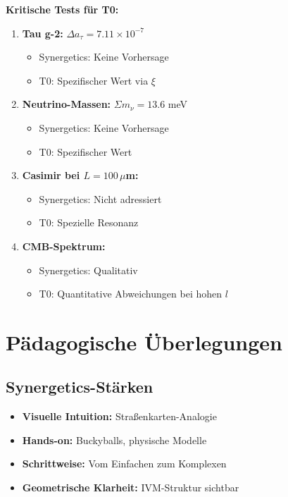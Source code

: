\documentclass[12pt,a4paper]{article}
\newcommand{\xipar}{\xi}
\begin{document}
	\begin{vorteil}
		\textbf{Kritische Tests für T0:}
		
		\begin{enumerate}
			\item \textbf{Tau g-2:} $\Delta a_\tau = 7.11 \times 10^{-7}$
			\begin{itemize}
				\item Synergetics: Keine Vorhersage
				\item T0: Spezifischer Wert via $\xipar$
			\end{itemize}
			
			\item \textbf{Neutrino-Massen:} $\Sigma m_\nu = 13.6$ meV
			\begin{itemize}
				\item Synergetics: Keine Vorhersage
				\item T0: Spezifischer Wert
			\end{itemize}
			
			\item \textbf{Casimir bei $L = 100\,\mu$m:}
			\begin{itemize}
				\item Synergetics: Nicht adressiert
				\item T0: Spezielle Resonanz
			\end{itemize}
			
			\item \textbf{CMB-Spektrum:}
			\begin{itemize}
				\item Synergetics: Qualitativ
				\item T0: Quantitative Abweichungen bei hohen $l$
			\end{itemize}
		\end{enumerate}
	\end{vorteil}
	
	\section{Pädagogische Überlegungen}
	
	\subsection{Synergetics-Stärken}
	
	\begin{itemize}
		\item \textbf{Visuelle Intuition:} Straßenkarten-Analogie
		\item \textbf{Hands-on:} Buckyballs, physische Modelle
		\item \textbf{Schrittweise:} Vom Einfachen zum Komplexen
		\item \textbf{Geometrische Klarheit:} IVM-Struktur sichtbar
	\end{itemize}
	
\end{document}
